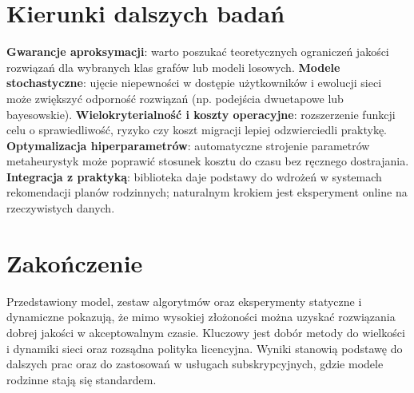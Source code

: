 \section{Kierunki dalszych badań}

\textbf{Gwarancje aproksymacji}: warto poszukać teoretycznych ograniczeń jakości rozwiązań dla wybranych klas grafów lub modeli losowych.
\textbf{Modele stochastyczne}: ujęcie niepewności w dostępie użytkowników i ewolucji sieci może zwiększyć odporność rozwiązań (np. podejścia dwuetapowe lub bayesowskie).
\textbf{Wielokryterialność i koszty operacyjne}: rozszerzenie funkcji celu o sprawiedliwość, ryzyko czy koszt migracji lepiej odzwierciedli praktykę.
\textbf{Optymalizacja hiperparametrów}: automatyczne strojenie parametrów metaheurystyk może poprawić stosunek kosztu do czasu bez ręcznego dostrajania.
\textbf{Integracja z praktyką}: biblioteka daje podstawy do wdrożeń w systemach rekomendacji planów rodzinnych; naturalnym krokiem jest eksperyment online na rzeczywistych danych.

\section{Zakończenie}

Przedstawiony model, zestaw algorytmów oraz eksperymenty statyczne i dynamiczne pokazują, że mimo wysokiej złożoności można uzyskać rozwiązania dobrej jakości w akceptowalnym czasie. Kluczowy jest dobór metody do wielkości i dynamiki sieci oraz rozsądna polityka licencyjna. Wyniki stanowią podstawę do dalszych prac oraz do zastosowań w usługach subskrypcyjnych, gdzie modele rodzinne stają się standardem.
